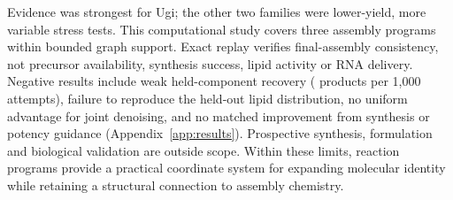 \documentclass{article}
\begin{document}
Evidence was strongest for Ugi; the other two families were lower-yield, more variable stress tests.
This computational study covers three assembly programs within bounded graph support. Exact replay
verifies final-assembly consistency, not precursor availability, synthesis success, lipid activity
or RNA delivery. Negative results include weak held-component recovery
(\ForgeProseCommonForgeHeldPerThousand{} products per 1,000 attempts), failure to reproduce the
held-out lipid distribution, no uniform advantage for joint denoising, and no matched improvement
from synthesis or potency guidance (Appendix~\ref{app:results}). Prospective synthesis, formulation
and biological validation are outside scope. Within these limits, reaction programs provide a
practical coordinate system for expanding molecular identity while retaining a structural
connection to assembly chemistry.
\end{document}
